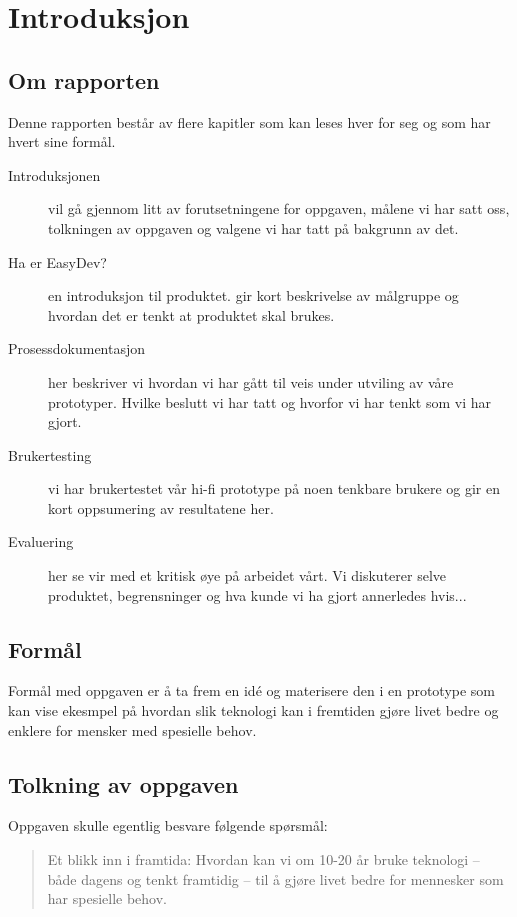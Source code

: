 \chapter{Introduksjon}

\section{Om rapporten}
Denne rapporten består av flere kapitler som kan leses hver for seg og som har hvert sine formål.


\begin{description}

\item[Introduksjonen] vil gå gjennom litt av forutsetningene for oppgaven, målene vi har satt oss, tolkningen av oppgaven og valgene vi har tatt på bakgrunn av det. 

\item[Ha er EasyDev?] en introduksjon til produktet. gir kort beskrivelse av målgruppe og hvordan det er tenkt at produktet skal brukes.

\item[Prosessdokumentasjon] her beskriver vi hvordan vi har gått til veis under utviling av våre prototyper. Hvilke beslutt vi har tatt og hvorfor vi har tenkt som vi har gjort.

\item[Brukertesting] vi har brukertestet vår hi-fi prototype på noen tenkbare brukere og gir en kort oppsumering av resultatene her.

\item[Evaluering] her se vir med et kritisk øye på arbeidet vårt. Vi diskuterer selve produktet, begrensninger og hva kunde vi ha gjort annerledes hvis...

\end{description}

\section{Formål}
Formål med oppgaven er å ta frem en idé og materisere den i en prototype som kan vise ekesmpel på hvordan slik teknologi kan i fremtiden gjøre livet bedre og enklere for mensker med spesielle behov. 

\section{Tolkning av oppgaven}
Oppgaven skulle egentlig besvare følgende spørsmål: 
\begin{quote}
Et	blikk	inn	i	framtida:	Hvordan	kan	vi	om	10-20	år	bruke	teknologi	
– både	dagens	og	tenkt	framtidig	– til	å	gjøre	livet	bedre	for	
mennesker	som	har	spesielle behov.
\end{quote}

